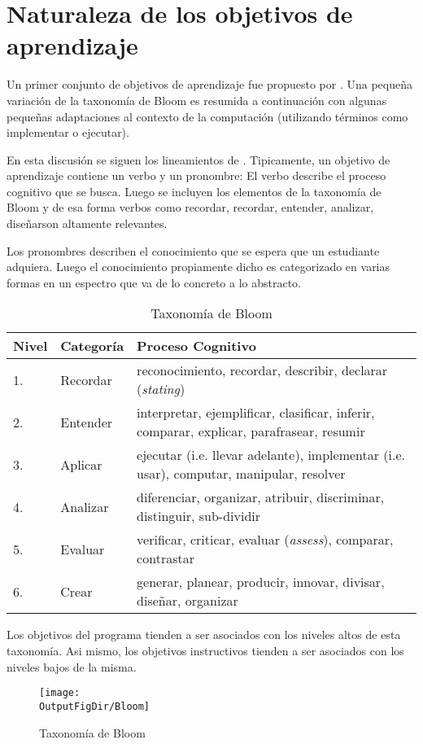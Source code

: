 \section{Naturaleza de los objetivos de aprendizaje}
Un primer conjunto de objetivos de aprendizaje fue propuesto por \cite{Bloom56Taxonomy}. 
Una pequeña variación de la taxonomía de Bloom es resumida a continuación con algunas 
pequeñas adaptaciones al contexto de la computación (utilizando términos como implementar o ejecutar).

En esta discusión se siguen los lineamientos de \cite{Anderson2001Bloom}. 
Tipicamente, un objetivo de aprendizaje contiene un verbo y un pronombre:
El verbo describe el proceso cognitivo que se busca. Luego se incluyen los 
elementos de la taxonomía de Bloom y de esa forma verbos como 
recordar, recordar, entender, analizar, diseñarson altamente relevantes.

Los pronombres describen el conocimiento que se espera que un estudiante adquiera. Luego el conocimiento 
propiamente dicho es categorizado en varias formas en un espectro que va de lo concreto a lo abstracto.

\begin{center}
\begin{table}[h!]
\begin{tabularx}{\textwidth}{|l|l|X|}\hline
\textbf{Nivel} & \textbf{Categoría}      & \textbf{Proceso Cognitivo} \\ \hline
1.     & Recordar 	& reconocimiento, recordar, describir, declarar (\textit{stating}) \\ \hline
2.     & Entender 	& interpretar, ejemplificar, clasificar, inferir, comparar, explicar, parafrasear, resumir \\ \hline
3.     & Aplicar        & ejecutar (i.e. llevar adelante), implementar (i.e. usar), computar, manipular, resolver \\ \hline
4.     & Analizar      	& diferenciar, organizar, atribuir, discriminar, distinguir, sub-dividir \\ \hline 
5.     & Evaluar     	& verificar, criticar, evaluar (\textit{assess}), comparar, contrastar \\ \hline
6.     & Crear       	& generar, planear, producir, innovar, divisar, diseñar, organizar \\ \hline
\end{tabularx}
\label{tab:BloomTaxonomy}
\caption{Taxonomía de Bloom}
\end{table}
\end{center}

Los objetivos del programa tienden a ser asociados con los niveles altos de esta taxonomía. Asi mismo, 
los objetivos instructivos tienden a ser asociados con los niveles bajos de la misma.

\begin{figure}[h!]
\texttt{[image: \\OutputFigDir/Bloom]}
\label{fig:BloomTaxonomy}
\caption{Taxonomía de Bloom}
\end{figure} 
